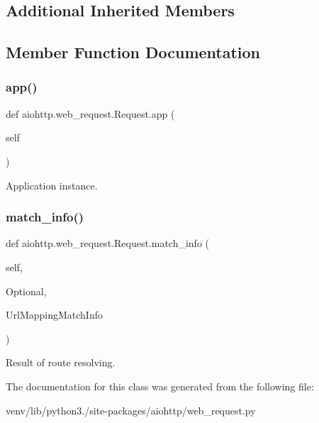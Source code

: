 \subsection*{Additional Inherited Members}


\subsection{Member Function Documentation}
\mbox{\label{classaiohttp_1_1web__request_1_1_request_ae32ffb42208ec9db389968ffee60f1a2}} 
\subsubsection{\texorpdfstring{app()}{app()}}
{\footnotesize\ttfamily def aiohttp.\+web\+\_\+request.\+Request.\+app (\begin{DoxyParamCaption}\item[{}]{self }\end{DoxyParamCaption})}

\begin{DoxyVerb}Application instance.\end{DoxyVerb}
 \mbox{\label{classaiohttp_1_1web__request_1_1_request_a15c4b2fa0edea3b3d71646739ebc1d88}} 
\subsubsection{\texorpdfstring{match\+\_\+info()}{match\_info()}}
{\footnotesize\ttfamily def aiohttp.\+web\+\_\+request.\+Request.\+match\+\_\+info (\begin{DoxyParamCaption}\item[{}]{self,  }\item[{}]{Optional,  }\item[{}]{Url\+Mapping\+Match\+Info }\end{DoxyParamCaption})}

\begin{DoxyVerb}Result of route resolving.\end{DoxyVerb}
 

The documentation for this class was generated from the following file\+:\begin{DoxyCompactItemize}
\item 
venv/lib/python3./site-\/packages/aiohttp/web\+\_\+request.\+py\end{DoxyCompactItemize}
